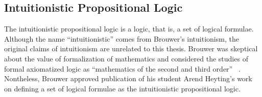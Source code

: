 \subsection{Intuitionistic Propositional Logic}

The intuitionistic propositional logic is a logic, that is, a set of
logical formulae.
Although the name ``intuitionistic'' comes from Brouwer's
intuitionism,
the original claims of intuitionism are unrelated to this thesis.
Brouwer was skeptical about the value of formalization of
mathematics and considered the studies of formal axiomatized logic as
``mathematics of the second and third order''%
~\citep[p.~10]{stigt1998}.
Nontheless, Brouwer approved publication of his student Arend Heyting's
work on defining a set of logical formulae as the intuitionistic
propositional logic.

